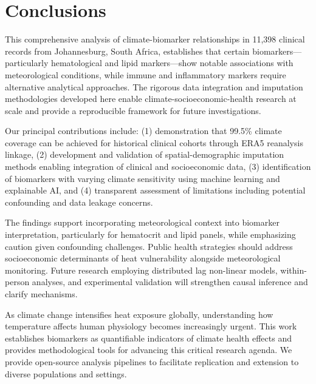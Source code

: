 \section{Conclusions}

This comprehensive analysis of climate-biomarker relationships in 11,398 clinical records from Johannesburg, South Africa, establishes that certain biomarkers---particularly hematological and lipid markers---show notable associations with meteorological conditions, while immune and inflammatory markers require alternative analytical approaches. The rigorous data integration and imputation methodologies developed here enable climate-socioeconomic-health research at scale and provide a reproducible framework for future investigations.

Our principal contributions include: (1) demonstration that 99.5\% climate coverage can be achieved for historical clinical cohorts through ERA5 reanalysis linkage, (2) development and validation of spatial-demographic imputation methods enabling integration of clinical and socioeconomic data, (3) identification of biomarkers with varying climate sensitivity using machine learning and explainable AI, and (4) transparent assessment of limitations including potential confounding and data leakage concerns.

The findings support incorporating meteorological context into biomarker interpretation, particularly for hematocrit and lipid panels, while emphasizing caution given confounding challenges. Public health strategies should address socioeconomic determinants of heat vulnerability alongside meteorological monitoring. Future research employing distributed lag non-linear models, within-person analyses, and experimental validation will strengthen causal inference and clarify mechanisms.

As climate change intensifies heat exposure globally, understanding how temperature affects human physiology becomes increasingly urgent. This work establishes biomarkers as quantifiable indicators of climate health effects and provides methodological tools for advancing this critical research agenda. We provide open-source analysis pipelines to facilitate replication and extension to diverse populations and settings.
